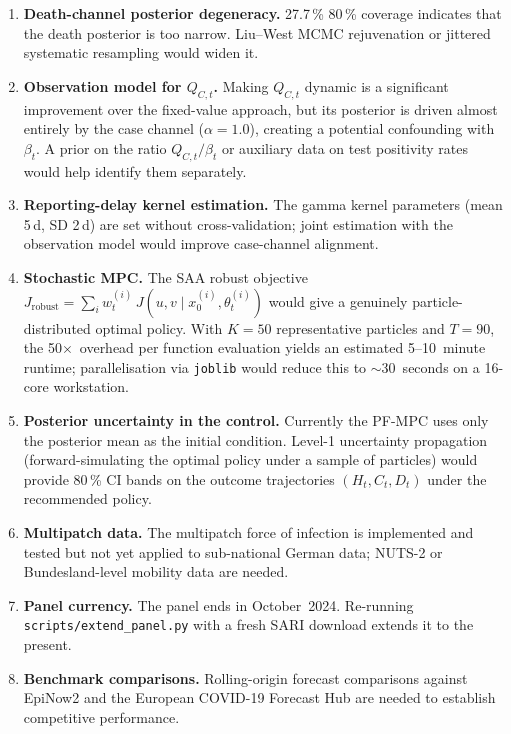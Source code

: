 \documentclass[11pt]{article}
\begin{document}
\begin{enumerate}
  \item \textbf{Death-channel posterior degeneracy.}
        27.7\,\% 80\,\% coverage indicates that the death posterior
        is too narrow.  Liu--West MCMC rejuvenation or jittered
        systematic resampling would widen it.

  \item \textbf{Observation model for $Q_{C,t}$.}
        Making $Q_{C,t}$ dynamic is a significant improvement over the
        fixed-value approach, but its posterior is driven almost
        entirely by the case channel ($\alpha=1.0$), creating a
        potential confounding with $\beta_t$.
        A prior on the ratio $Q_{C,t}/\beta_t$ or auxiliary data on
        test positivity rates would help identify them separately.

  \item \textbf{Reporting-delay kernel estimation.}
        The gamma kernel parameters (mean 5\,d, SD 2\,d) are set without
        cross-validation; joint estimation with the observation model
        would improve case-channel alignment.

  \item \textbf{Stochastic MPC.}
        The SAA robust objective
        $J_{\mathrm{robust}}=\sum_i w_t^{(i)}\,J(u,v\mid x_0^{(i)},
        \theta_t^{(i)})$ would give a genuinely particle-distributed
        optimal policy.  With $K=50$ representative particles and
        $T=90$, the 50$\times$~overhead per function evaluation yields
        an estimated 5--10~minute runtime; parallelisation via
        \texttt{joblib} would reduce this to $\sim$30~seconds on
        a 16-core workstation.

  \item \textbf{Posterior uncertainty in the control.}
        Currently the PF-MPC uses only the posterior mean as the
        initial condition.  Level-1 uncertainty propagation
        (forward-simulating the optimal policy under a sample of
        particles) would provide 80\,\% CI bands on the outcome
        trajectories $(H_t, C_t, D_t)$ under the recommended policy.

  \item \textbf{Multipatch data.}
        The multipatch force of infection is implemented and tested but
        not yet applied to sub-national German data;
        NUTS-2 or Bundesland-level mobility data are needed.

  \item \textbf{Panel currency.}
        The panel ends in October~2024.  Re-running
        \texttt{scripts/extend\_panel.py} with a fresh SARI download
        extends it to the present.

  \item \textbf{Benchmark comparisons.}
        Rolling-origin forecast comparisons against EpiNow2
        \cite{abbott2020} and the European COVID-19 Forecast Hub
        \cite{sherratt2023} are needed to establish competitive
        performance.
\end{enumerate}
\end{document}
